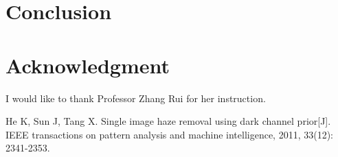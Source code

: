 \documentclass[journal,comsoc]{IEEEtran}
\begin{document}
\section{Conclusion}

\section*{Acknowledgment}
I would like to thank Professor Zhang Rui for her instruction.

\begin{thebibliography}{1}
  He K, Sun J, Tang X. Single image haze removal using dark channel prior[J].
  IEEE transactions on pattern analysis and machine intelligence, 2011, 33(12): 2341-2353.
\end{thebibliography}



\vfill
\end{document}
